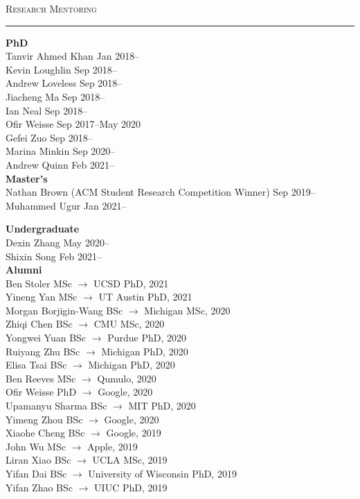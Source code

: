\documentclass[10pt]{article}
\newcommand{\mysec}[1]{\vspace{2em}\textsc{\large #1}\vspace{1mm}\hrule\vspace{2mm}}
\newcommand{\mysub}[3]{\textbf{#1} {#2} \hfill {\em #3}}
\begin{document}
\mysec{Research Mentoring}
\mysub{PhD}{}{} \\
Tanvir Ahmed Khan \hfill Jan 2018--\\
Kevin Loughlin \hfill Sep 2018-- \\
Andrew Loveless \hfill Sep 2018-- \\
Jiacheng Ma \hfill Sep 2018-- \\
Ian Neal \hfill Sep 2018-- \\
Ofir Weisse \hfill Sep 2017--May 2020 \\
Gefei Zuo \hfill Sep 2018-- \\
Marina Minkin \hfill Sep 2020-- \\
Andrew Quinn \hfill Feb 2021-- \\

\mysub{Master's}{}{} \\
Nathan Brown (ACM Student Research Competition Winner) \hfill Sep 2019-- \\
Muhammed Ugur \hfill Jan 2021--

\mysub{Undergraduate}{}{} \\
Dexin Zhang \hfill May 2020-- \\
Shixin Song \hfill Feb 2021-- \\

\mysub{Alumni}{}{} \\

Ben Stoler \hfill MSc $\rightarrow$ UCSD PhD, 2021 \\
Yineng Yan \hfill MSc $\rightarrow$ UT Austin PhD, 2021 \\
Morgan Borjigin-Wang \hfill BSc $\rightarrow$ Michigan MSc, 2020 \\
Zhiqi Chen \hfill BSc $\rightarrow$ CMU MSc, 2020 \\
Yongwei Yuan \hfill BSc $\rightarrow$ Purdue PhD, 2020 \\
Ruiyang Zhu \hfill BSc $\rightarrow$ Michigan PhD, 2020 \\
Elisa Tsai \hfill BSc $\rightarrow$ Michigan PhD, 2020 \\
Ben Reeves \hfill MSc $\rightarrow$ Qumulo, 2020 \\
Ofir Weisse \hfill PhD $\rightarrow$ Google, 2020 \\
Upamanyu Sharma \hfill BSc $\rightarrow$ MIT PhD, 2020 \\
Yimeng Zhou \hfill BSc $\rightarrow$ Google, 2020 \\
Xiaohe Cheng \hfill BSc $\rightarrow$ Google, 2019 \\
John Wu \hfill MSc $\rightarrow$ Apple, 2019\\
Liran Xiao \hfill BSc $\rightarrow$ UCLA MSc, 2019 \\
Yifan Dai \hfill BSc $\rightarrow$ University of Wisconsin PhD, 2019 \\
Yifan Zhao \hfill BSc $\rightarrow$ UIUC PhD, 2019 \\
\end{document}
